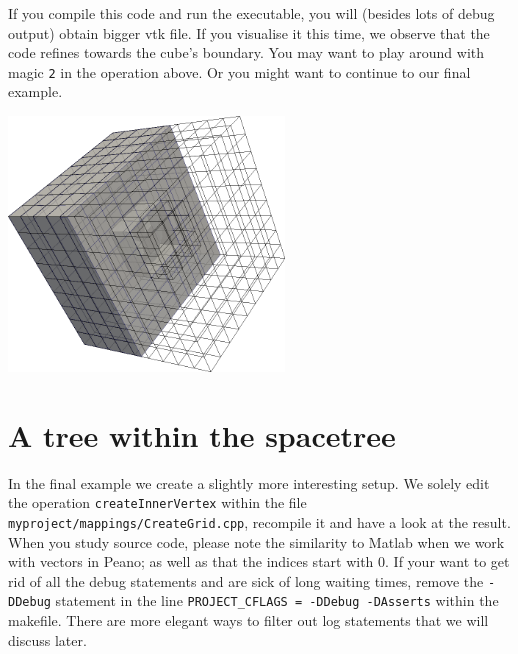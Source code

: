 \noindent
If you compile this code and run the executable, you will (besides lots of
debug output) obtain bigger vtk file. 
If you visualise it this time, we observe that the code refines towards the
cube's boundary. 
You may want to play around with magic \texttt{2} in the operation above. 
Or you might want to continue to our final example.

\begin{center}
  \includegraphics[width=0.55\textwidth]{10_quickstart/cube.png}
\end{center}


\section{A tree within the spacetree}

In the final example we create a slightly more interesting setup. 
We solely edit the operation \texttt{createInnerVertex} within the  
file \texttt{myproject/mappings/CreateGrid.cpp}, recompile it and 
have a look at the result.
When you study source code, please note the similarity to Matlab when we work
with vectors in Peano; as well as that the indices start with 0.
If your want to get rid of all the debug statements and are sick of long 
waiting times, remove the \texttt{-DDebug} statement in the line  
\texttt{PROJECT\_CFLAGS = -DDebug -DAsserts}
within the makefile.
There are more elegant ways to filter out log statements that we will discuss
later.


